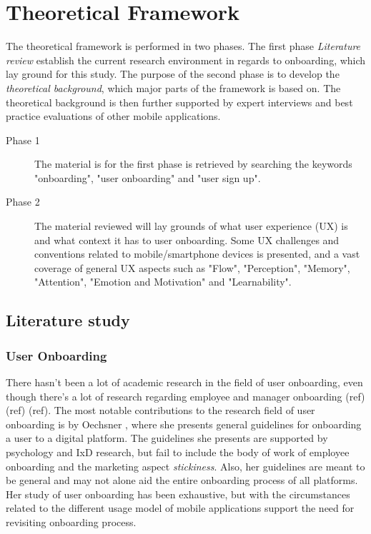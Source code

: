 \chapter{Theoretical Framework}
\label{chap:theoretical_framework}
The theoretical framework is performed in two phases. The first phase \textit{Literature review} establish the current research environment in regards to onboarding, which lay ground for this study. The purpose of the second phase is to develop the \textit{theoretical background}, which major parts of the framework is based on. The theoretical background is then further supported by expert interviews and best practice evaluations of other mobile applications.

\begin{description}
  \item [Phase 1] The material is for the first phase is retrieved by searching the keywords "onboarding", "user onboarding" and "user sign up".
  \item [Phase 2] The material reviewed will lay grounds of what user experience (UX) is and what context it has to user onboarding. Some UX challenges and conventions related to mobile/smartphone devices is presented, and a vast coverage of general UX aspects such as "Flow", "Perception", "Memory", "Attention", "Emotion and Motivation" and "Learnability".
\end{description}

\section{Literature study}
\subsection{User Onboarding}
There hasn't been a lot of academic research in the field of user onboarding, even though there's a lot of research regarding employee and manager onboarding (ref) (ref) (ref). The most notable contributions to the research field of user onboarding is by Oechsner \cite{Oechsner2016}, where she presents general guidelines for onboarding a user to a digital platform. The guidelines she presents are supported by psychology and IxD research, but fail to include the body of work of employee onboarding and the marketing aspect \textit{stickiness}. Also, her guidelines are meant to be general and may not alone aid the entire onboarding process of all platforms. Her study of user onboarding has been exhaustive, but with the circumstances related to the different usage model of mobile applications support the need for revisiting onboarding process.

